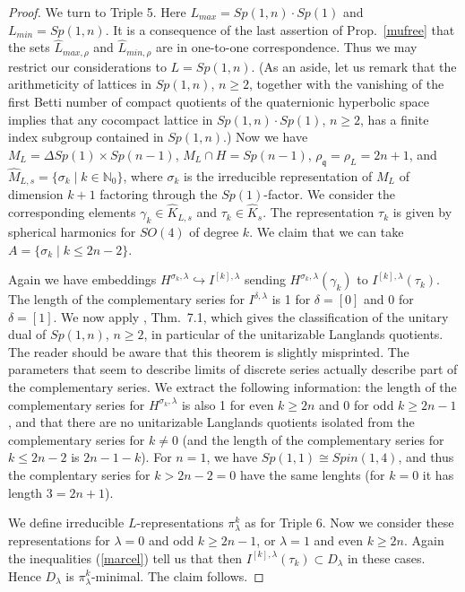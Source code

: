 \documentclass[10]{amsart}
\theoremstyle{remark}
\theoremstyle{definition}
\numberwithin{equation}{section}
\newcommand{\N}{\mathbb{N}}           %
\newcommand{\fq}{{\mathfrak q}}
\begin{document}
{\begin{proof}
We turn to Triple 5. Here $L_{max}=Sp(1,n)\cdot Sp(1)$ and $L_{min}=Sp(1,n)$. It is a consequence of the last assertion of Prop.~\ref{mufree} that the sets $\widehat L_{max,\rho}$
and $\widehat L_{min,\rho}$ are in one-to-one correspondence. Thus we may restrict our considerations to $L=Sp(1,n)$. (As an aside, let us remark that the arithmeticity of lattices in $Sp(1,n)$, $n\ge 2$,
together with the vanishing of the first Betti number of compact quotients of the quaternionic hyperbolic space implies that any cocompact lattice in $Sp(1,n)\cdot Sp(1)$, $n\ge 2$, has a finite index subgroup
contained in $Sp(1,n)$.) Now we have $M_L=\Delta Sp(1)\times Sp(n-1)$, $M_L\cap H=Sp(n-1)$, $\rho_\fq=\rho_L=2n+1$, and 
$\widehat M_{L,s}=\{\sigma_k\mid k\in\N_0\}$, where $\sigma_k$ is the irreducible representation of $M_L$ of dimension $k+1$ factoring through the $Sp(1)$-factor.
We consider the corresponding elements  $\gamma_k\in \widehat K_{L,s}$ and $\tau_k\in \widehat K_s$. The representation $\tau_k$ is given by spherical harmonics for $SO(4)$
of degree $k$.
We claim that we can take $A=\{\sigma_k\mid k\le 2n-2\}$.

Again we have embeddings $H^{\sigma_k,\lambda}\hookrightarrow I^{[k],\lambda}$ sending $H^{\sigma_k,\lambda}(\gamma_k)$ to $I^{[k],\lambda}(\tau_k)$. The length of the complementary series for $I^{\delta,\lambda}$ is 1 for
$\delta=[0]$ and 0 for $\delta=[1]$. We now apply \cite{BS 81}, Thm.~7.1, which gives the classification of the unitary dual of $Sp(1,n)$, $n\ge 2$, in particular of the unitarizable Langlands quotients. The reader should be aware that this theorem is slightly misprinted. The parameters that seem to describe limits of discrete series actually describe part of the complementary
series. We extract the following information: the length of the complementary series  for $H^{\sigma_k,\lambda}$ is also 1 for even $k\ge 2n$
and $0$ for odd $k\ge 2n-1$, and that there are no unitarizable Langlands quotients isolated from the complementary series for $k\ne 0$ (and the length of the complementary series
for $k\le 2n-2$ is $2n-1-k$). For $n=1$, we have $Sp(1,1)\cong Spin(1,4)$, and thus the complentary series for $k>2n-2= 0$ have the same lenghts (for $k=0$ it has length $3=2n+1$).

We define irreducible $L$-representations $\pi^k_\lambda$ as for Triple 6. Now we consider these representations for $\lambda=0$ and odd $k\ge 2n-1$,
or $\lambda=1$ and even $k\ge 2n$.  Again the
inequalities (\ref{marcel}) tell us that then $I^{[k],\lambda}(\tau_k)\subset D_\lambda$ in these cases. Hence $D_\lambda$ is $\pi^k_\lambda$-minimal. The claim follows.


\end{proof}}
\end{document}
